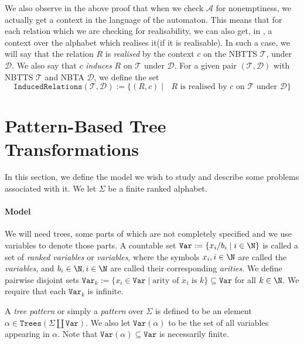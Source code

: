 \documentclass[12pt, a4paper]{article}
\newcommand{\T}{\mathcal{T}}
\newcommand{\D}{\mathcal{D}}
\newcommand{\Alphabet}{\ensuremath{\Sigma}}
\newcommand{\Variables}{\texttt{Var}}
\newcommand{\Trees}[1]{\ensuremath{\texttt{Trees}\left(#1\right)}}
\newcommand{\RealisableRelations}[2]{\ensuremath{\texttt{InducedRelations}\left(#1, #2\right)}}
\newcommand{\automaton}{\ensuremath{\mathcal{A}}}
\begin{document}
We also observe in the above proof that when we check $\automaton$ for nonemptiness, we actually get a context in the language of the automaton. This means that for each relation which we are checking for realisability, we can also get, in \expt, a context over the alphabet which realises it(if it is realisable). In such a case, we will say that the relation $R$ is \emph{realised} by the context $c$ on the NBTTS $\T$, under $\D$. We also say that $c$ \emph{induces} $R$ on $\T$ under $\D$. 
For a given pair $(\T, \D)$ with NBTTS $\T$ and NBTA $\D$, we define the set
\[ \RealisableRelations{\T}{\D} := \{(R, c) \mid \mbox{ $R$ is realised by $c$ on $\T$ under $\D$}\} \]



\section{Pattern-Based Tree Transformations}\label{sec:modelProblems}

In this section, we define the model we wish to study and describe some problems associated with it. We let $\Alphabet$ be a finite ranked alphabet.

\paragraph*{Model}\label{par:model}

We will need trees, some parts of which are not completely specified and we use variables to denote those parts. A countable set $\Variables := \{ x_i/b_i \mid i \in \N \}$ is called a set of \emph{ranked variables} or \emph{variables}, where the symbols $x_i, i \in \N$ are called the \emph{variables}, and $b_i \in \N, i \in \N$ are called their corresponding \emph{arities}. We define pairwise disjoint sets $\Variables_k := \{x_i \in \Variables \mid \mbox{arity of $x_i$ is $k$}\} \subseteq \Variables$ for all $k \in \N$. We require that each $\Variables_k$ is infinite.

\begin{definition}[Pattern]\label{def:pattern}
    A \emph{tree pattern} or simply a \emph{pattern} over $\Alphabet$ is defined to be an element $\alpha \in \Trees{\Alphabet \coprod \Variables}$. We also let \emph{$\Variables(\alpha)$} to be the set of all variables appearing in $\alpha$. Note that $\Variables(\alpha) \subseteq \Variables$ is necessarily finite.
\end{definition}
\end{document}
